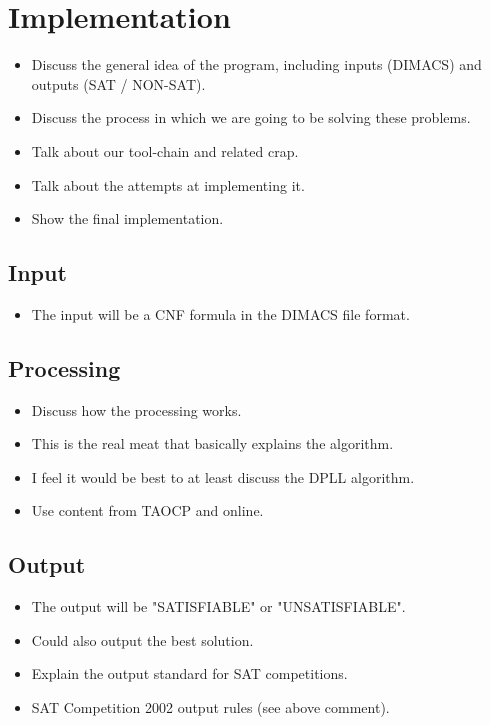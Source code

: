 \documentclass{article}
\begin{document}
\section{Implementation}
\begin{itemize}
    \item Discuss the general idea of the program, including inputs (DIMACS) and outputs (SAT / NON-SAT).
    \item Discuss the process in which we are going to be solving these problems.
    \item Talk about our tool-chain and related crap.
    \item Talk about the attempts at implementing it.
    \item Show the final implementation.
\end{itemize}

\subsection{Input}
\begin{itemize}
    \item The input will be a CNF formula in the DIMACS file format.
\end{itemize}

\subsection{Processing}
\begin{itemize}
    \item Discuss how the processing works.
    \item This is the real meat that basically explains the algorithm.
    \item I feel it would be best to at least discuss the DPLL algorithm.
    \item Use content from TAOCP and online.
\end{itemize}

\subsection{Output}
\begin{itemize}
    \item The output will be "SATISFIABLE" or "UNSATISFIABLE".
    \item Could also output the best solution.
    \item Explain the output standard for SAT competitions.
    \item SAT Competition 2002 output rules (see above comment).
\end{itemize}
\end{document}
